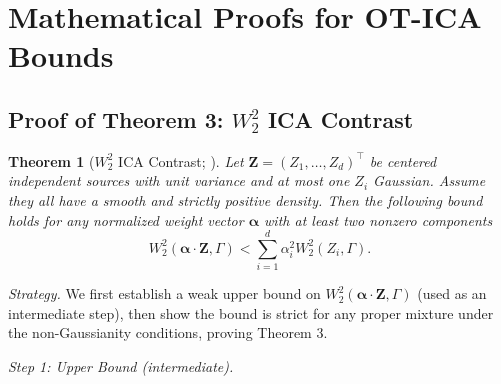 \documentclass[accepted]{tpm2026} %
\newtheorem{theorem}{Theorem}
\begin{document}
\section{Mathematical Proofs for OT-ICA Bounds}
\label{app:proofs}

\subsection{Proof of Theorem 3: $W_2^2$ ICA Contrast}

\setcounter{theorem}{2}
\begin{theorem}[$W_2^2$ ICA Contrast; \citealt{johnson2005central}]
Let $\mathbf{Z} = (Z_1, \dots, Z_d)^\top$ be  centered independent sources with unit variance and at most one $Z_i$ Gaussian. Assume they all have a smooth and strictly positive density. Then the following bound holds for  any normalized weight vector $\mathbf{\alpha}$ with at least two nonzero components
\begin{equation}
    W_2^2(\mathbf{\alpha} \cdot \mathbf{Z}, \Gamma) < \sum_{i=1}^d \alpha_i^2 W_2^2(Z_i, \Gamma).
\end{equation}
\end{theorem}

\textit{Strategy.} We first establish a weak upper bound on $W_2^2(\mathbf{\alpha}\cdot\mathbf{Z},\Gamma)$ (used as an intermediate step), then show the bound is strict for any proper mixture under the non-Gaussianity conditions, proving Theorem 3.

\medskip\noindent\textit{Step 1: Upper Bound (intermediate).}
\end{document}
